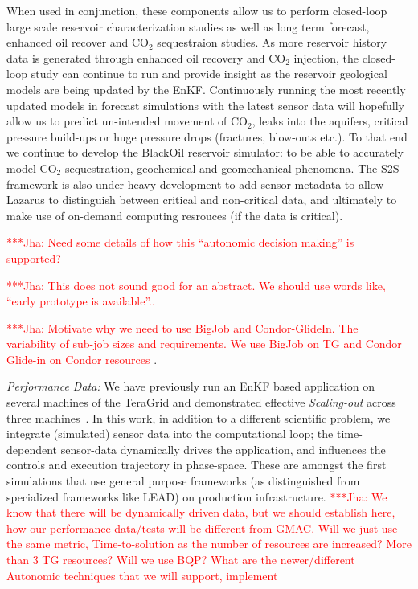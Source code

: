 \documentclass[conference,final]{IEEEtran}
\newcommand{\jhanote}[1]{ {\textcolor{red} { ***Jha: #1 }}}
\newcommand{\jhanote}[1]{}
\begin{document}
When used in conjunction, these components allow us to perform closed-loop large scale reservoir characterization studies as well as long term forecast, enhanced oil recover and CO$_2$ sequestraion studies. As more reservoir history data is generated through enhanced oil recovery and CO$_2$ injection, the closed-loop study can continue to run and provide insight as the reservoir geological models are being updated by the EnKF. Continuously running the most recently updated models in forecast simulations with the latest sensor data will hopefully allow us to predict un-intended movement of CO$_2$, leaks into the aquifers, critical pressure build-ups or huge pressure drops (fractures, blow-outs etc.).  To that end we continue to develop the BlackOil reservoir simulator: to be able to accurately model CO$_2$ sequestration, geochemical and geomechanical phenomena. The S2S framework is also under heavy development to add sensor metadata to allow Lazarus to distinguish between critical and non-critical data, and ultimately to make use of on-demand computing resrouces (if the data is critical). 

\jhanote{Need some details of how this ``autonomic decision making'' is supported?}

\jhanote{This does not sound good for an abstract. We should use words like, ``early prototype is available''..}

\jhanote{Motivate why we need to use BigJob and Condor-GlideIn. The variability of
sub-job sizes and requirements. We use BigJob on TG and Condor Glide-in on Condor
resources}.

{\it Performance Data: }We have previously run an EnKF based application on several machines of the TeraGrid and demonstrated effective {\it Scaling-out} across three machines~\cite{gmac}. In this work, in addition to a different scientific problem, we integrate (simulated) sensor data into the computational loop; the time-dependent sensor-data dynamically drives the application, and influences the controls and execution trajectory in phase-space. These are amongst the first simulations that use general purpose frameworks (as distinguished from specialized frameworks like LEAD) on production infrastructure. \jhanote{We know that there will be dynamically driven data, but we should establish here, how our performance data/tests will be different from GMAC.  Will we just use the same metric, Time-to-solution as the number of resources are increased? More than 3 TG resources? Will we use BQP? What are the newer/different Autonomic techniques that we will support, implement}
\end{document}
